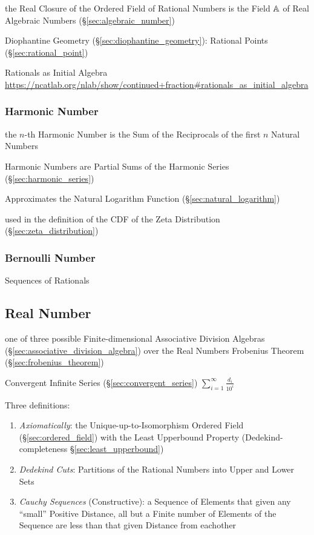 the Real Closure of the Ordered Field of Rational Numbers is the Field
$\mathbb{A}$ of Real Algebraic Numbers (\S\ref{sec:algebraic_number})

\fist Diophantine Geometry (\S\ref{sec:diophantine_geometry}): Rational Points
(\S\ref{sec:rational_point})

Rationals as Initial Algebra
\url{https://ncatlab.org/nlab/show/continued+fraction#rationals_as_initial_algebra}



\subsubsection{Harmonic Number}\label{sec:harmonic_number}

the $n$-th Harmonic Number is the Sum of the Reciprocals of the first $n$
Natural Numbers

\fist Harmonic Numbers are Partial Sums of the Harmonic Series
(\S\ref{sec:harmonic_series})

Approximates the Natural Logarithm Function (\S\ref{sec:natural_logarithm})

used in the definition of the CDF of the Zeta Distribution
(\S\ref{sec:zeta_distribution})



\subsubsection{Bernoulli Number}\label{sec:bernoulli_number}

Sequences of Rationals




\subsection{Real Number}\label{sec:real_number}

one of three possible Finite-dimensional Associative Division Algebras
(\S\ref{sec:associative_division_algebra}) over the Real Numbers \fist
Frobenius Theorem (\S\ref{sec:frobenius_theorem})

Convergent Infinite Series (\S\ref{sec:convergent_series}) $\sum_{i =
  1}^{\infty} \frac{d_i}{10^i}$

Three definitions:
\begin{enumerate}
  \item \emph{Axiomatically}: the Unique-up-to-Isomorphism Ordered Field
    (\S\ref{sec:ordered_field}) with the Least Upperbound Property
    (Dedekind-completeness \S\ref{sec:least_upperbound})
  \item \emph{Dedekind Cuts}: Partitions of the Rational Numbers into
    Upper and Lower Sets
  \item \emph{Cauchy Sequences} (Constructive): a Sequence of Elements that
    given any ``small'' Positive Distance, all but a Finite number of Elements
    of the Sequence are less than that given Distance from eachother
\end{enumerate}

